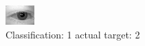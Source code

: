 \begin{figure}[h!]
\begin{center}
\includegraphics[width=0.60\columnwidth]{figures/ID346_class_1_target_2.png}
\end{center}
\caption{ Classification: 1 actual target: 2}
\label{fig:ID346_class_1_target_2}
\end{figure}
